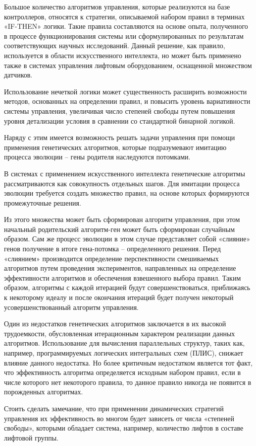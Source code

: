 	Большое количество алгоритмов управления, которые реализуются на базе контроллеров,
		относятся к стратегии, описываемой набором правил в терминах «IF-THEN» логики.
		Такие правила составляются на основе опыта, полученного в процессе функционирования
		системы или сформулированных по результатам соответствующих научных исследований.
		Данный решение, как правило, используется в области искусственного интеллекта,
		но может быть применено также в системах управления лифтовым оборудованием, оснащенной множеством датчиков.

	Использование нечеткой логики может существенность расширить возможности методов,
		основанных на определении правил, и повысить уровень вариативности системы управления,
		увеличивая число степеней свободы путем повышения уровня детализации условия
		в сравнении со стандартной бинарной логикой.

	Наряду с этим имеется возможность решать задачи управления при помощи применения
		генетических алгоритмов, которые подразумевают имитацию процесса эволюции – гены родителя наследуются потомками.

	В системах с применением искусственного интеллекта генетические алгоритмы рассматриваются
		как совокупность отдельных шагов. Для имитации процесса эволюции
		требуется создать множество правил, на основе которых формируются промежуточные решения.

	Из этого множества может быть сформирован алгоритм управления,
		при этом начальный родительский алгоритм-ген может быть сформирован случайным образом.
		Сам же процесс эволюции в этом случае представляет собой «слияние» генов получение
		в итоге гена-потомка – определенного решения.
		Перед «слиянием» производится определение перспективности смешиваемых алгоритмов
		путем проведения экспериментов, направленных на определение эффективности алгоритмов
		и обеспечения взвешенного выбора правил. Таким образом, алгоритмы с каждой итерацией
		будут совершенствоваться, приближаясь к некоторому идеалу и после окончания итераций
		будет получен некоторый усовершенствованный алгоритм управления.

	Один из недостатков генетических алгоритмов заключается в их высокой трудоемкости,
		обусловленная итерационным характером реализации данных алгоритмов.
		Использование для вычисления параллельных структур, таких как, например,
		программируемых логических интегральных схем (ПЛИС),
		снижает влияние данного недостатка. Но более критичным недостатком является тот факт,
		что эффективность алгоритма определяется исходным набором правил,
		если в числе которого нет некоторого правила, то данное правило никогда не появится в порожденных алгоритмах.

	Стоить сделать замечание, что при применении динамических стратегий управления их эффективность
		во многом будет зависеть от числа «степеней свободы», которыми обладает система,
		например, количество лифтов в составе лифтовой группы.
